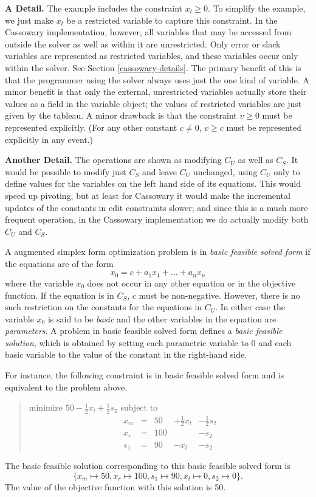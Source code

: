 \documentclass{article}
\begin{document}
{\bf A Detail.}  The example includes the constraint $x_l \geq 0$.  To
simplify the example, we just make $x_l$ be a restricted variable to
capture this constraint.  In the Cassowary implementation, however, all
variables that may be accessed from outside the solver as well as within it
are unrestricted.  Only error or slack variables are represented as
restricted variables, and these variables occur only within the solver.
See Section \ref{cassowary-details}.  The primary benefit of this is
that the programmer using the solver always uses just the one kind of
variable.  A minor benefit is that only the external, unrestricted
variables actually store their values as a field in the variable object;
the values of restricted variables are just given by the tableau.  A minor
drawback is that the constraint $v \geq 0$ must be represented explicitly.
(For any other constant $c \neq 0$, $v \geq c$ must be represented
explicitly in any event.)

{\bf Another Detail.}  The operations are shown as modifying $C_U$ as well
as $C_S$\@.  It would be possible to modify just $C_S$ and leave $C_U$
unchanged, using $C_U$ only to define values for the variables on the left
hand side of its equations.  This would speed up pivoting, but at least for
Cassowary it would make the incremental updates of the constants in edit
constraints slower; and since this is a much more frequent operation, in
the Cassowary implementation we do actually modify both $C_U$ and $C_S$\@.

A augmented simplex form optimization problem is in 
\emph{basic feasible solved form} if the equations are of the form 
$$x_0 = c + a_1 x_1 + \ldots + a_n x_n$$ where the variable $x_0$ does not
occur in any other equation or in the objective function.  If the equation
is in $C_S$, $c$ must be non-negative.  However, there is no
such restriction on the constants for the equations in $C_U$\@.  In either
case the variable $x_0$ is said to be \emph{basic} and the other
variables in the equation are \emph{parameters}.  A problem in basic
feasible solved form defines a \emph{basic feasible solution}, which is
obtained by setting each parametric variable to 0 and each basic variable
to the value of the constant in the right-hand side.

For instance, the following constraint
is in basic feasible solved form and is equivalent to the 
problem above.
\begin{quote}\vspace*{-1ex}
minimize $50 - \frac{1}{2} x_l + \frac{1}{2} s_2 $ 
subject to 
$$
\begin{array}{rlrrr} 
x_m & = &50 & + \frac{1}{2} x_l & - \frac{1}{2} s_2 \\
x_r & = &100 &  & - s_2 \\ \hline
s_1 & = &90 & - x_l &  - s_2 
\end{array}
$$
\end{quote}\vspace{-0.9ex}
The basic feasible solution corresponding to this
basic feasible solved form is 
$$\{x_m \mapsto 50, x_r \mapsto 100, s_1 \mapsto 90, x_l \mapsto 0, 
s_2 \mapsto 0\}.$$
The value of the objective function with this solution is 50.
\end{document}
